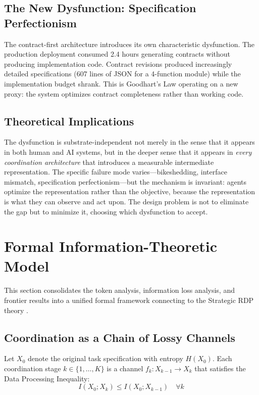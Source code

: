 \documentclass[11pt,a4paper]{article}
\begin{document}
\subsection{The New Dysfunction: Specification Perfectionism}

The contract-first architecture introduces its own characteristic dysfunction. The production deployment consumed 2.4 hours generating contracts without producing implementation code. Contract revisions produced increasingly detailed specifications (607 lines of JSON for a 4-function module) while the implementation budget shrank. This is Goodhart's Law operating on a new proxy: the system optimizes contract completeness rather than working code.

\subsection{Theoretical Implications}

The dysfunction is substrate-independent not merely in the sense that it appears in both human and AI systems, but in the deeper sense that it appears in \emph{every coordination architecture} that introduces a measurable intermediate representation. The specific failure mode varies---bikeshedding, interface mismatch, specification perfectionism---but the mechanism is invariant: agents optimize the representation rather than the objective, because the representation is what they can observe and act upon. The design problem is not to eliminate the gap but to minimize it, choosing which dysfunction to accept.


\section{Formal Information-Theoretic Model}
\label{sec:formal-model}

This section consolidates the token analysis, information loss analysis, and frontier results into a unified formal framework connecting to the Strategic RDP theory \citep{mcentire2025channel}.

\subsection{Coordination as a Chain of Lossy Channels}

Let $X_0$ denote the original task specification with entropy $H(X_0)$. Each coordination stage $k \in \{1, \ldots, K\}$ is a channel $f_k: X_{k-1} \to X_k$ that satisfies the Data Processing Inequality:
\begin{equation}
I(X_0; X_k) \leq I(X_0; X_{k-1}) \quad \forall k
\end{equation}
\end{document}
